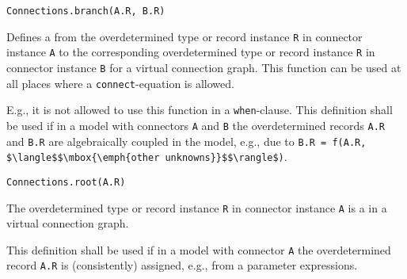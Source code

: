 \begin{operatordefinition}
\begin{synopsis}\begin{lstlisting}
Connections.branch(A.R, B.R)
\end{lstlisting}\end{synopsis}
\begin{semantics}
Defines a  from the overdetermined type or record instance \lstinline!R! in connector instance \lstinline!A! to the corresponding overdetermined type or record instance \lstinline!R! in connector instance \lstinline!B! for a virtual connection graph.
This function can be used at all places where a \lstinline!connect!-equation is allowed.

\begin{nonnormative}
E.g., it is not allowed to use this function in a \lstinline!when!-clause.
This definition shall be used if in a model with connectors \lstinline!A! and \lstinline!B! the overdetermined records \lstinline!A.R! and \lstinline!B.R! are algebraically coupled in the model, e.g., due to \lstinline!B.R = f(A.R, $\langle$$\mbox{\emph{other unknowns}}$$\rangle$)!.
\end{nonnormative}
\end{semantics}
\end{operatordefinition}

\begin{operatordefinition}
\begin{synopsis}\begin{lstlisting}
Connections.root(A.R)
\end{lstlisting}\end{synopsis}
\begin{semantics}
The overdetermined type or record instance \lstinline!R! in connector instance \lstinline!A! is a  in a virtual connection graph.

\begin{nonnormative}
This definition shall be used if in a model with connector \lstinline!A! the overdetermined record \lstinline!A.R! is (consistently) assigned, e.g., from a parameter expressions.
\end{nonnormative}
\end{semantics}
\end{operatordefinition}

